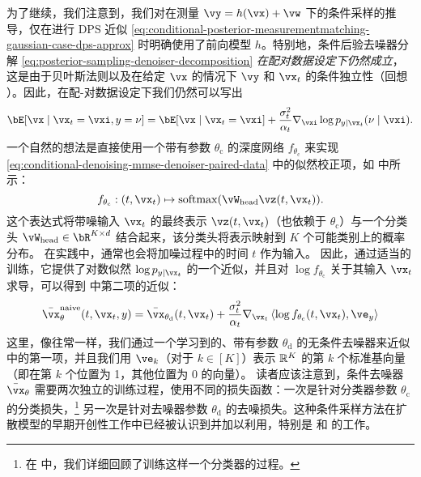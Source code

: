 \documentclass[../../book-main_zh.tex]{subfiles}
\begin{document}
为了继续，我们注意到，我们对在测量 $\vy = h(\vx) + \vw$ 下的条件采样的推导，仅在进行 DPS 近似 \eqref{eq:conditional-posterior-measurementmatching-gaussian-case-dps-approx} 时明确使用了前向模型 $h$。特别地，条件后验去噪器分解 \eqref{eq:posterior-sampling-denoiser-decomposition} \textit{在配对数据设定下仍然成立}，这是由于贝叶斯法则以及在给定 $\vx$ 的情况下 $\vy$ 和 $\vx_t$ 的条件独立性（回想 ）。因此，在配-对数据设定下我们仍然可以写出
\begin{equation}\label{eq:conditional-denoising-mmse-denoiser-paired-data}
  \bE[ \vx \mid \vx_t=\vxi, y=\nu]
  =
  \bE[\vx \mid \vx_t=\vxi] 
  + \frac{\sigma_t^2}{\alpha_t} 
  \nabla_{\vxi}\log p_{y \mid \vx_t}(\nu\mid \vxi).
\end{equation}
一个自然的想法是直接使用一个带有参数 $\theta_{\mathrm{c}}$ 的深度网络 $f_{\theta_{\mathrm{c}}}$ 来实现 \eqref{eq:conditional-denoising-mmse-denoiser-paired-data} 中的似然校正项，如  中所示：
\begin{equation}
  f_{\theta_{\mathrm{c}}} : (t, \vx_t) \mapsto \softmax(\vW_{\mathrm{head}}
  \vz(t, \vx_t)).
\end{equation}
这个表达式将带噪输入 $\vx_t$ 的最终表示 $\vz(t, \vx_t)$（也依赖于 $\theta_{\mathrm{c}}$）与一个分类头 $\vW_{\mathrm{head}} \in \bR^{K \times d}$ 结合起来，该分类头将表示映射到 $K$ 个可能类别上的概率分布。
在实践中，通常也会将加噪过程中的时间 $t$ 作为输入。
因此，通过适当的训练，它提供了对数似然 $\log p_{y \mid \vx_t}$ 的一个近似，并且对 $\log f_{\theta_{\mathrm{c}}}$ 关于其输入 $\vx_t$ 求导，可以得到  中第二项的近似：
\begin{equation}\label{eq:conditional-denoising-mmse-denoiser-paired-data-approx}
  \bar{\vx}_{\theta}^{\mathrm{naive}}(t, \vx_t, y)
  =
  \bar{\vx}_{\theta_{\mathrm{d}}}(t, \vx_t)
  + \frac{\sigma_t^2}{\alpha_t}
  \nabla_{\vx_t}
  \ip*{
    \log f_{\theta_{\mathrm{c}}}(t, \vx_t)
  }{
    \ve_{y}
  }
\end{equation}
这里，像往常一样，我们通过一个学习到的、带有参数 $\theta_{\mathrm{d}}$ 的无条件去噪器来近似  中的第一项，并且我们用 $\ve_k$（对于 $k \in [K]$）表示 $\mathbb{R}^K$ 的第 $k$ 个标准基向量（即在第 $k$ 个位置为 1，其他位置为 0 的向量）。
读者应该注意到，条件去噪器 $\bar{\vx}_{\theta}$ 需要两次独立的训练过程，使用不同的损失函数：一次是针对分类器参数 $\theta_{\mathrm{c}}$ 的分类损失，\footnote{在  中，我们详细回顾了训练这样一个分类器的过程。} 另一次是针对去噪器参数 $\theta_{\mathrm{d}}$ 的去噪损失。这种条件采样方法在扩散模型的早期开创性工作中已经被认识到并加以利用，特别是 \citet{Sohl-Dickstein2015} 和 \citet{song2020score} 的工作。
\end{document}
